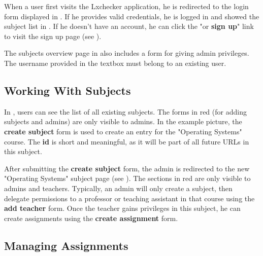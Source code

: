 
When a user first visits the Lxchecker application, he is redirected to the login form displayed in . If he provides valid credentials, he is logged in and showed the subject list in . If he doesn't have an account, he can click the "or \textbf{sign up}" link to visit the sign up page (see ).

The subjects overview page in  also includes a form for giving admin privileges. The username provided in the textbox must belong to an existing user.


\subsection{Working With Subjects}
\label{sub-sec:usage-authentication}

In , users can see the list of all existing subjects. The forms in red (for adding subjects and admins) are only visible to admins. In the example picture, the \textbf{create subject} form is used to create an entry for the "Operating Systems" course. The \textbf{id} is short and meaningful, as it will be part of all future URLs in this subject.


After submitting the \textbf{create subject} form, the admin is redirected to the new "Operating Systems" subject page (see ). The sections in red are only visible to admins and teachers. Typically, an admin will only create a subject, then delegate permissions to a professor or teaching assistant in that course using the \textbf{add teacher} form. Once the teacher gains privileges in this subject, he can create assignments using the \textbf{create assignment} form.


\subsection{Managing Assignments}
\label{sub-sec:usage-authentication}

